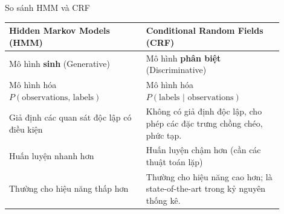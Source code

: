 \begin{assess}{So sánh HMM và CRF}
\begin{tabular}{p{0.45\linewidth} | p{0.45\linewidth}}
    \textbf{Hidden Markov Models (HMM)} & \textbf{Conditional Random Fields (CRF)} \\
    \hline
    Mô hình \textbf{sinh} (Generative) & Mô hình \textbf{phân biệt} (Discriminative) \\
    \hline
    Mô hình hóa $P(\text{observations, labels})$ & Mô hình hóa $P(\text{labels | observations})$ \\
    \hline
    Giả định các quan sát độc lập có điều kiện & Không có giả định độc lập, cho phép các đặc trưng chồng chéo, phức tạp. \\
    \hline
    Huấn luyện nhanh hơn & Huấn luyện chậm hơn (cần các thuật toán lặp) \\
    \hline
    Thường cho hiệu năng thấp hơn & Thường cho hiệu năng cao hơn; là state-of-the-art trong kỷ nguyên thống kê. \\
\end{tabular}
\end{assess}